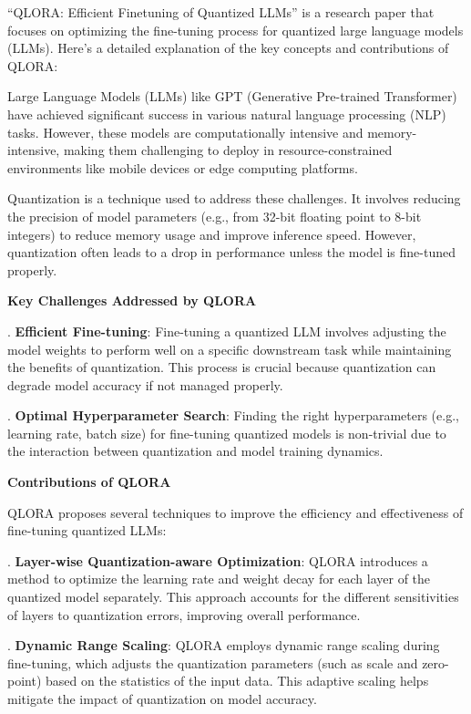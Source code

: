 \hfill \break
``QLORA: Efficient Finetuning of Quantized LLMs'' is a research paper that focuses on optimizing the fine-tuning process for quantized large language models (LLMs). Here’s a detailed explanation of the key concepts and contributions of QLORA:


\hfill \break
Large Language Models (LLMs) like GPT (Generative Pre-trained Transformer) have achieved significant success in various natural language processing (NLP) tasks. However, these models are computationally intensive and memory-intensive, making them challenging to deploy in resource-constrained environments like mobile devices or edge computing platforms.

\hfill \break
Quantization is a technique used to address these challenges. It involves reducing the precision of model parameters (e.g., from 32-bit floating point to 8-bit integers) to reduce memory usage and improve inference speed. However, quantization often leads to a drop in performance unless the model is fine-tuned properly.

\hfill \break
\textbf{Key Challenges Addressed by QLORA}

\hfill {}. \textbf{Efficient Fine-tuning}: Fine-tuning a quantized LLM involves adjusting the model weights to perform well on a specific downstream task while maintaining the benefits of quantization. This process is crucial because quantization can degrade model accuracy if not managed properly.

\hfill {}. \textbf{Optimal Hyperparameter Search}: Finding the right hyperparameters (e.g., learning rate, batch size) for fine-tuning quantized models is non-trivial due to the interaction between quantization and model training dynamics.

\hfill \break
\textbf{Contributions of QLORA}

QLORA proposes several techniques to improve the efficiency and effectiveness of fine-tuning quantized LLMs:


\hfill {}. \textbf{Layer-wise Quantization-aware Optimization}: QLORA introduces a method to optimize the learning rate and weight decay for each layer of the quantized model separately. This approach accounts for the different sensitivities of layers to quantization errors, improving overall performance.


\hfill {}. \textbf{Dynamic Range Scaling}: QLORA employs dynamic range scaling during fine-tuning, which adjusts the quantization parameters (such as scale and zero-point) based on the statistics of the input data. This adaptive scaling helps mitigate the impact of quantization on model accuracy.


